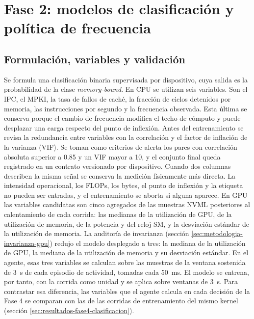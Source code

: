 \section{Fase 2: modelos de clasificación y política de frecuencia}
\label{sec:met-fase2}

\subsection{Formulación, variables y validación}
\label{sec:contrato-features}\label{sec:metodologia-correlacion-cpu}

Se formula una clasificación binaria supervisada por dispositivo, cuya salida es la probabilidad de la clase \textit{memory-bound}. En CPU se utilizan seis variables. Son el IPC, el MPKI, la tasa de fallos de caché, la fracción de ciclos detenidos por memoria, las instrucciones por segundo y la frecuencia observada. Esta última se conserva porque el cambio de frecuencia modifica el techo de cómputo y puede desplazar una carga respecto del punto de inflexión. Antes del entrenamiento se revisa la redundancia entre variables con la correlación y el factor de inflación de la varianza (VIF). Se toman como criterios de alerta los pares con correlación absoluta superior a 0.85 y un VIF mayor a 10, y el conjunto final queda registrado en un contrato versionado por dispositivo. Cuando dos columnas describen la misma señal se conserva la medición físicamente más directa. La intensidad operacional, los FLOPs, los bytes, el punto de inflexión y la etiqueta no pueden ser entradas, y el entrenamiento se aborta si alguna aparece. En GPU las variables candidatas son cinco agregados de las muestras NVML posteriores al calentamiento de cada corrida: las medianas de la utilización de GPU, de la utilización de memoria, de la potencia y del reloj SM, y la desviación estándar de la utilización de memoria. La auditoría de invarianza (sección \ref{sec:metodologia-invarianza-gpu}) redujo el modelo desplegado a tres: la mediana de la utilización de GPU, la mediana de la utilización de memoria y su desviación estándar. En el agente, esas tres variables se calculan sobre las muestras de la ventana sostenida de 3~s de cada episodio de actividad, tomadas cada 50~ms. El modelo se entrena, por tanto, con la corrida como unidad y se aplica sobre ventanas de 3~s. Para contrastar esa diferencia, las variables que el agente calcula en cada decisión de la Fase 4 se comparan con las de las corridas de entrenamiento del mismo kernel (sección \ref{sec:resultados-fase4-clasificacion}).

